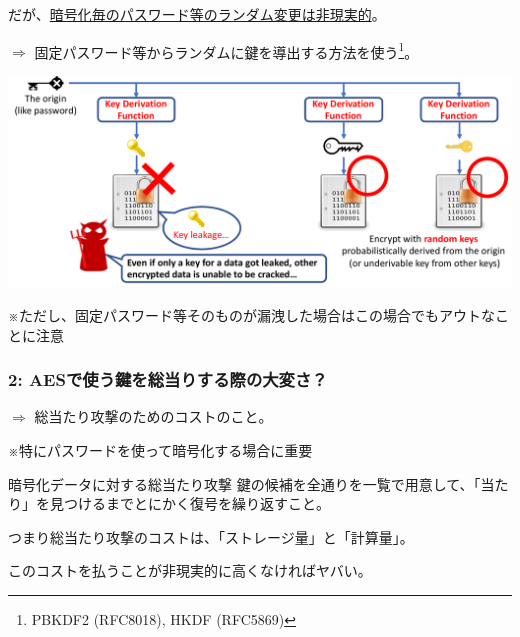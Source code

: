 \documentclass[12pt,dvipdfmx]{beamer}
\begin{document}
\begin{frame}
だが、\underline{暗号化毎のパスワード等のランダム変更は非現実的}。

\vspace{2ex}

$\Rightarrow$ \alert{固定パスワード等からランダムに鍵を導出する方法}を使う\footnote[frame]{PBKDF2 (RFC8018), HKDF (RFC5869)}。

\begin{center}
\includegraphics[width=0.9\linewidth]{Figs/pfs_kdf_case.pdf}
\end{center}

※ただし、固定パスワード等そのものが漏洩した場合はこの場合でもアウトなことに注意
\end{frame}

\begin{frame}
\frametitle{2: AESで使う鍵を総当りする際の大変さ？}

$\Rightarrow$ 総当たり攻撃のためのコストのこと。

\alert{※特にパスワードを使って暗号化する場合に重要}

\vspace{1ex}

\begin{block}{\small 暗号化データに対する総当たり攻撃}
鍵の候補を全通りを一覧で用意して、「当たり」を見つけるまでとにかく復号を繰り返すこと。
\end{block}

\vspace{2ex}

つまり総当たり攻撃のコストは、「ストレージ量」と「計算量」。

\alert{このコストを払うことが非現実的に高くなければヤバい。}
\end{frame}
\end{document}
